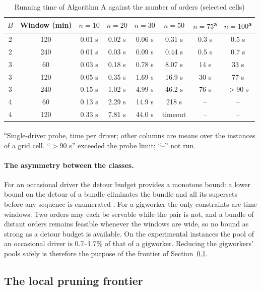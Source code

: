 \begin{table}[t]
\centering
\caption{Running time of Algorithm A against the number of orders (selected cells)}
\label{tab:scaling}
\small
\begin{tabular}{cccccccc}
\toprule
$B$ & Window (min) & $n=10$ & $n=20$ & $n=30$ & $n=50$ & $n=75$\textsuperscript{a} & $n=100$\textsuperscript{a}\\
\midrule
2 & 120 & 0.01 s & 0.02 s & 0.06 s & 0.31 s & 0.3 s & 0.5 s\\
2 & 240 & 0.01 s & 0.03 s & 0.09 s & 0.44 s & 0.5 s & 0.7 s\\
3 & 60  & 0.03 s & 0.18 s & 0.78 s & 8.07 s & 14 s & 33 s\\
3 & 120 & 0.05 s & 0.35 s & 1.69 s & 16.9 s & 30 s & 77 s\\
3 & 240 & 0.15 s & 1.02 s & 4.99 s & 46.2 s & 76 s & $>90$ s\\
4 & 60  & 0.13 s & 2.29 s & 14.9 s & 218 s & -- & --\\
4 & 120 & 0.33 s & 7.81 s & 44.0 s & timeout & -- & --\\
\bottomrule
\end{tabular}
\par\smallskip\footnotesize \textsuperscript{a}Single-driver probe, time per driver; other columns are means over the instances of a grid cell. ``$>90$ s'' exceeded the probe limit; ``--'' not run.
\end{table}

\paragraph{The asymmetry between the classes.} For an occasional driver the
detour budget provides a monotone bound: a lower bound on the detour of a
bundle eliminates the bundle and all its supersets before any sequence is
enumerated \citep{li2026auction}. For a gigworker the only constraints are
time windows. Two orders may each be servable while the pair is not, and a
bundle of distant orders remains feasible whenever the windows are wide, so
no bound as strong as a detour budget is available. On the experimental
instances the pool of an occasional driver is 0.7--1.7\% of that of a
gigworker. Reducing the gigworkers' pools safely is therefore the purpose of
the frontier of Section~\ref{sec:sd-frontier}.

\subsection{The local pruning frontier}
\label{sec:sd-frontier}

